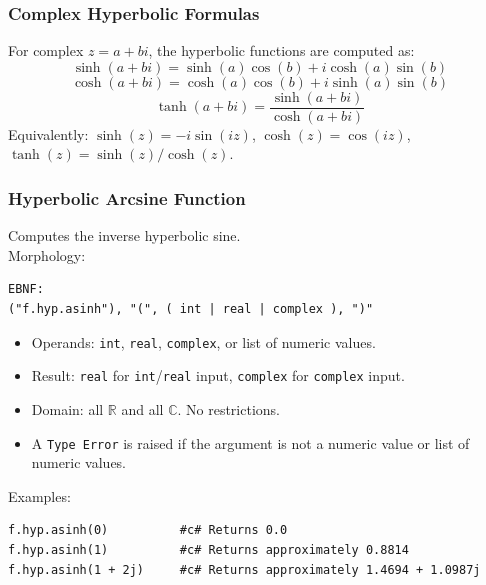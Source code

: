\subsubsection{Complex Hyperbolic Formulas}
For complex $z = a + bi$, the hyperbolic functions are computed as:
\[
\sinh(a + bi) = \sinh(a)\cos(b) + i\cosh(a)\sin(b)
\]
\[
\cosh(a + bi) = \cosh(a)\cos(b) + i\sinh(a)\sin(b)
\]
\[
\tanh(a + bi) = \frac{\sinh(a + bi)}{\cosh(a + bi)}
\]
Equivalently: $\sinh(z) = -i \sin(iz)$, $\cosh(z) = \cos(iz)$, $\tanh(z) = \sinh(z) / \cosh(z)$.

\subsubsection{Hyperbolic Arcsine Function}
Computes the inverse hyperbolic sine. \\
Morphology:
\begin{verbatim}
EBNF:
("f.hyp.asinh"), "(", ( int | real | complex ), ")"
\end{verbatim}
\begin{itemize}
\item Operands: \texttt{int}, \texttt{real}, \texttt{complex}, or list of numeric values.
\item Result: \texttt{real} for \texttt{int}/\texttt{real} input, \texttt{complex} for \texttt{complex} input.
\item Domain: all $\mathbb{R}$ and all $\mathbb{C}$. No restrictions.
\item A \texttt{Type Error} is raised if the argument is not a numeric value or list of numeric values.
\end{itemize}
Examples:
\begin{verbatim}
f.hyp.asinh(0)          #c# Returns 0.0
f.hyp.asinh(1)          #c# Returns approximately 0.8814
f.hyp.asinh(1 + 2j)     #c# Returns approximately 1.4694 + 1.0987j
\end{verbatim}

